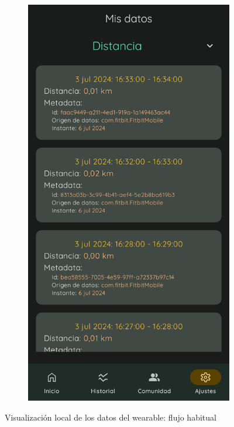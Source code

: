 \begin{figure}[htbp]
                \hspace{0.1\textwidth}
                \begin{subfigure}[c]{0.27\textwidth}
                    \centering
                    \includegraphics[width=1\linewidth]{figures/pruebas/local_wearable/Datos distancia.png}
                \end{subfigure}
                \caption{Visualización local de los datos del wearable: flujo habitual}
                \label{figure:pruebas:visualizacion_local:habitual}
            \end{figure}

